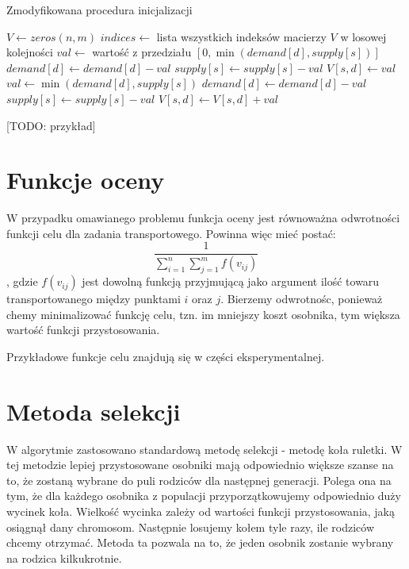 \begin{pseudokod}[H]
    \label{inicjalizacja-2}
    \caption{Zmodyfikowana procedura inicjalizacji}
    \BlankLine
    $V \gets zeros(n, m)$
    $indices \gets$ lista wszystkich indeksów macierzy $V$ w losowej kolejności\;
    \BlankLine
     {
        $val \gets$ wartość z przedziału $[0, \min(demand[d], supply[s])]$\;
        $demand[d] \gets demand[d] - val$\;
        $supply[s] \gets supply[s] - val$\;
        $V[s, d] \gets val$\;
    }
    \BlankLine
     {
        $val \gets \min(demand[d], supply[s])$\;
        $demand[d] \gets demand[d] - val$\;
        $supply[s] \gets supply[s] - val$\;
        $V[s, d] \gets V[s, d] + val$\;
    }

\end{pseudokod}

[TODO: przykład]

\section{Funkcje oceny}
W przypadku omawianego problemu funkcja oceny jest równoważna odwrotności funkcji celu dla zadania transportowego. Powinna więc mieć postać:
$$\frac{1}{\sum_{i=1}^{n}\sum_{j=1}^{m} f(v_{ij})}$$, 
gdzie $f(v_{ij})$ jest dowolną funkcją przyjmującą jako argument ilość towaru transportowanego między punktami $i$ oraz $j$.
Bierzemy odwrotnośc, ponieważ chemy minimalizować funkcję celu, tzn. im mniejszy koszt osobnika, tym większa wartość funkcji przystosowania.

Przykładowe funkcje celu znajdują się w części eksperymentalnej.

\section{Metoda selekcji}
W algorytmie zastosowano standardową metodę selekcji - metodę koła ruletki. W tej metodzie lepiej przystosowane osobniki mają odpowiednio większe 
szanse na to, że zostaną wybrane do puli rodziców dla następnej generacji. Polega ona na tym, że dla każdego osobnika z populacji 
przyporzątkowujemy odpowiednio duży wycinek koła. Wielkość wycinka zależy od wartości funkcji przystosowania, jaką osiągnął dany chromosom. 
Następnie losujemy kołem tyle razy, ile rodziców chcemy otrzymać. Metoda ta pozwala na to, że jeden osobnik zostanie wybrany na rodzica kilkukrotnie.

